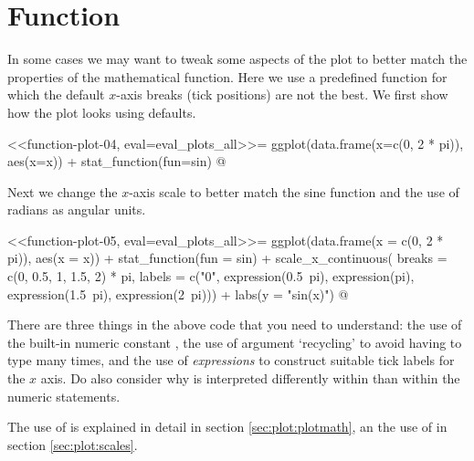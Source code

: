 
\section{Function}

\begin{explainbox}
In some cases we may want to tweak some aspects of the plot to better match the properties of the mathematical function. Here we use a predefined function for which the default $x$-axis breaks (tick positions) are not the best. We first show how the plot looks using defaults.

<<function-plot-04, eval=eval_plots_all>>=
ggplot(data.frame(x=c(0, 2 * pi)), aes(x=x)) +
  stat_function(fun=sin)
@

Next we change the $x$-axis scale to better match the sine function and the use of radians as angular units.

<<function-plot-05, eval=eval_plots_all>>=
ggplot(data.frame(x = c(0, 2 * pi)), aes(x = x)) +
  stat_function(fun = sin) +
  scale_x_continuous(
    breaks = c(0, 0.5, 1, 1.5, 2) * pi,
    labels = c("0", expression(0.5~pi), expression(pi),
             expression(1.5~pi), expression(2~pi))) +
  labs(y = "sin(x)")
@

There are three things in the above code that you need to understand: the use of the \Rlang built-in numeric constant , the use of argument `recycling' to avoid having to type  many times, and the use of \Rlang \emph{expressions} to construct suitable tick labels for the $x$ axis. Do also consider why  is interpreted differently within  than within the numeric statements.

The use of  is explained in detail in section \ref{sec:plot:plotmath}, an the use of  in section \ref{sec:plot:scales}.

\end{explainbox}